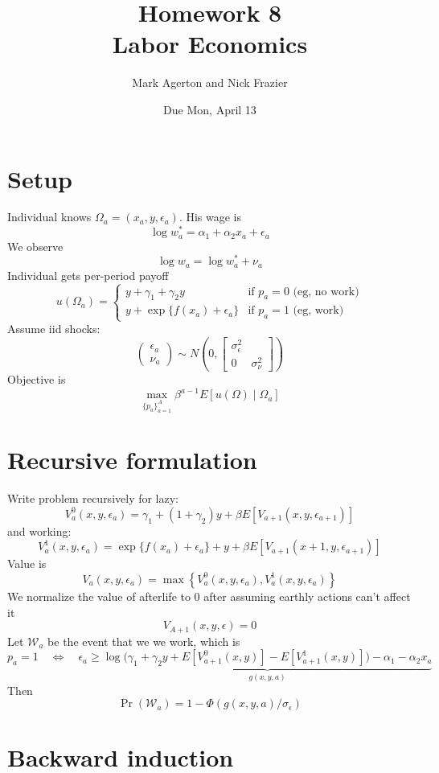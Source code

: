 \documentclass[11pt,letterpaper]{article}
\title{\textbf{Homework 8} \\ Labor Economics}
\author{Mark Agerton and Nick Frazier}
\date{Due Mon, April 13}
\begin{document}
\maketitle

\section{Setup}
Individual knows $\Omega_a = (x_a, y, \epsilon_a)$. His wage is 
\[
    \log w_a^* = \alpha_1 + \alpha_2 x_a + \epsilon_a
\]
We observe
\[
    \log w_a = \log w_a^* + \nu_a
\]
Individual gets per-period payoff
\[
u(\Omega_a) = 
\begin{cases}
    y + \gamma_1 + \gamma_2y         & \text{if } p_a = 0  \text{ (eg, no work)} \\
    y + \exp\{f(x_a) + \epsilon_a\}  & \text{if } p_a = 1  \text{ (eg, work)} 
\end{cases}
\]
Assume iid shocks:
\[
\begin{pmatrix}
\epsilon_a \\ \nu_a
\end{pmatrix}
\sim 
N\left(
0,
\begin{bmatrix}
\sigma_\epsilon^2  & \\
0 & \sigma^2_\nu
\end{bmatrix}
\right)
\]
Objective is
\[
\max_{\{p_a\}_{a=1}^A} \beta^{a-1} E\left[ u(\Omega) \middle| \Omega_a \right]
\]

\section{Recursive formulation}

Write problem recursively for lazy:
\[
V_a^0(x,y,\epsilon_a) = \gamma_1 + (1+\gamma_2)y + \beta E[V_{a+1}(x,y,\epsilon_{a+1})]
\]
and working:
\[
V_a^1(x,y,\epsilon_a) =
\exp\{f(x_a) + \epsilon_a\} + y + \beta E[V_{a+1}(x+1,y, \epsilon_{a+1})]
\]
Value is
\[
V_a(x,y,\epsilon_a) = \max\left\{V_a^0(x,y,\epsilon_a), V_a^1(x,y,\epsilon_a)\right\}
\]
We normalize the value of afterlife to 0 after assuming earthly actions can't affect it
\[
    V_{A+1}(x,y,\epsilon) = 0
\]
Let $\mathcal W_a$ be the event that we we work, which is 
\[
p_a = 1 \quad \Leftrightarrow \quad
\epsilon_a \geq \underbrace{ \log \bigg( \gamma_1 + \gamma_2 y + E[V_{a+1}^0(x,y)] - E[V_{a+1}^1(x,y)] \bigg) - \alpha_1 - \alpha_2 x_a }_{g(x,y,a)}
\]
Then 
\[
\Pr(\mathcal W_a) = 1- \Phi(g(x,y,a)/\sigma_\epsilon)
\]

\section{Backward induction}
\end{document}
